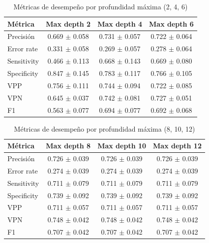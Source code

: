 \documentclass[a4paper,10pt]{article}
\begin{document}
    \begin{table}[h!]
        \centering
        \caption{Métricas de desempeño por profundidad máxima (2, 4, 6)}
        \begin{tabular}{lccc}
        \toprule
        Métrica & Max depth 2 & Max depth 4 & Max depth 6 \\
        \midrule
        Precisión & 0.669 $\pm$ 0.058 & 0.731 $\pm$ 0.057 & 0.722 $\pm$ 0.064 \\
        Error rate & 0.331 $\pm$ 0.058 & 0.269 $\pm$ 0.057 & 0.278 $\pm$ 0.064 \\
        Sensitivity & 0.466 $\pm$ 0.113 & 0.668 $\pm$ 0.143 & 0.669 $\pm$ 0.080 \\
        Specificity & 0.847 $\pm$ 0.145 & 0.783 $\pm$ 0.117 & 0.766 $\pm$ 0.105 \\
        VPP & 0.756 $\pm$ 0.111 & 0.744 $\pm$ 0.094 & 0.722 $\pm$ 0.085 \\
        VPN & 0.645 $\pm$ 0.037 & 0.742 $\pm$ 0.081 & 0.727 $\pm$ 0.051 \\
        F1 & 0.563 $\pm$ 0.077 & 0.694 $\pm$ 0.077 & 0.692 $\pm$ 0.068 \\
        \bottomrule
        \end{tabular}
        \label{tab:tree_depths_2_4_6}
    \end{table}

    \begin{table}[h!]
        \centering
        \caption{Métricas de desempeño por profundidad máxima (8, 10, 12)}
        \begin{tabular}{lccc}
        \toprule
        Métrica & Max depth 8 & Max depth 10 & Max depth 12 \\
        \midrule
        Precisión & 0.726 $\pm$ 0.039 & 0.726 $\pm$ 0.039 & 0.726 $\pm$ 0.039 \\
        Error rate & 0.274 $\pm$ 0.039 & 0.274 $\pm$ 0.039 & 0.274 $\pm$ 0.039 \\
        Sensitivity & 0.711 $\pm$ 0.079 & 0.711 $\pm$ 0.079 & 0.711 $\pm$ 0.079 \\
        Specificity & 0.739 $\pm$ 0.092 & 0.739 $\pm$ 0.092 & 0.739 $\pm$ 0.092 \\
        VPP & 0.711 $\pm$ 0.057 & 0.711 $\pm$ 0.057 & 0.711 $\pm$ 0.057 \\
        VPN & 0.748 $\pm$ 0.042 & 0.748 $\pm$ 0.042 & 0.748 $\pm$ 0.042 \\
        F1 & 0.707 $\pm$ 0.042 & 0.707 $\pm$ 0.042 & 0.707 $\pm$ 0.042 \\
        \bottomrule
        \end{tabular}
        \label{tab:tree_depths_8_10_12}
    \end{table}
\end{document}
